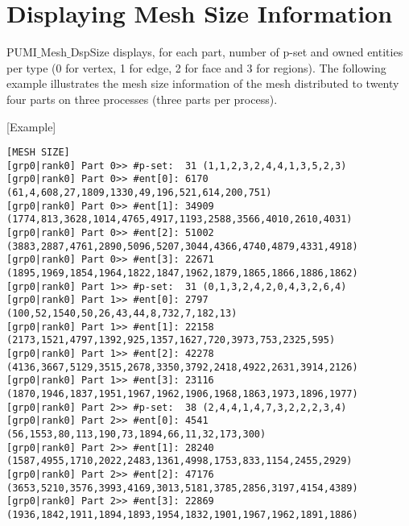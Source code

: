 
\section{Displaying Mesh Size Information}\label{sec:mnument}

PUMI$\_$Mesh$\_$DspSize displays, for each part, number of p-set and owned entities per type (0 for vertex, 1 for edge, 2 for face and 3 for regions). The following example illustrates the mesh size information of the mesh distributed to twenty four parts on three processes (three parts per process). 

[Example]
\begin{small}
\begin{verbatim}
[MESH SIZE]
[grp0|rank0] Part 0>> #p-set:  31 (1,1,2,3,2,4,4,1,3,5,2,3)
[grp0|rank0] Part 0>> #ent[0]: 6170 (61,4,608,27,1809,1330,49,196,521,614,200,751)
[grp0|rank0] Part 0>> #ent[1]: 34909 (1774,813,3628,1014,4765,4917,1193,2588,3566,4010,2610,4031)
[grp0|rank0] Part 0>> #ent[2]: 51002 (3883,2887,4761,2890,5096,5207,3044,4366,4740,4879,4331,4918)
[grp0|rank0] Part 0>> #ent[3]: 22671 (1895,1969,1854,1964,1822,1847,1962,1879,1865,1866,1886,1862)
[grp0|rank0] Part 1>> #p-set:  31 (0,1,3,2,4,2,0,4,3,2,6,4)
[grp0|rank0] Part 1>> #ent[0]: 2797 (100,52,1540,50,26,43,44,8,732,7,182,13)
[grp0|rank0] Part 1>> #ent[1]: 22158 (2173,1521,4797,1392,925,1357,1627,720,3973,753,2325,595)
[grp0|rank0] Part 1>> #ent[2]: 42278 (4136,3667,5129,3515,2678,3350,3792,2418,4922,2631,3914,2126)
[grp0|rank0] Part 1>> #ent[3]: 23116 (1870,1946,1837,1951,1967,1962,1906,1968,1863,1973,1896,1977)
[grp0|rank0] Part 2>> #p-set:  38 (2,4,4,1,4,7,3,2,2,2,3,4)
[grp0|rank0] Part 2>> #ent[0]: 4541 (56,1553,80,113,190,73,1894,66,11,32,173,300)
[grp0|rank0] Part 2>> #ent[1]: 28240 (1587,4955,1710,2022,2483,1361,4998,1753,833,1154,2455,2929)
[grp0|rank0] Part 2>> #ent[2]: 47176 (3653,5210,3576,3993,4169,3013,5181,3785,2856,3197,4154,4389)
[grp0|rank0] Part 2>> #ent[3]: 22869 (1936,1842,1911,1894,1893,1954,1832,1901,1967,1962,1891,1886)

\end{verbatim}
\end{small}

